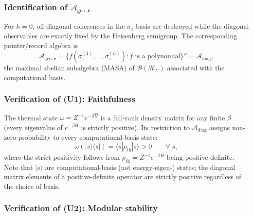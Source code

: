 \documentclass[12pt,a4paper,openany]{book}
\begin{document}
\subsubsection{Identification of $\mathcal{A}_{\mathrm{geo},\mathbf{c}}$}

For $h=0$, off-diagonal coherences in the $\sigma_z$ basis are destroyed while the diagonal observables are exactly fixed by the Heisenberg semigroup.  The corresponding pointer/record algebra is
\begin{equation}
\mathcal{A}_{\mathrm{geo},\mathbf{c}} = \{f(\sigma_z^{(1)}, \ldots, \sigma_z^{(n)}) : f \text{ is a polynomial}\}'' = \mathcal{A}_{\mathrm{diag}},
\end{equation}
the maximal abelian subalgebra (MASA) of $\mathcal{B}(\mathcal{H}_U)$ associated with the computational basis.

\subsubsection{Verification of (U1): Faithfulness}

The thermal state $\omega = Z^{-1}e^{-\beta\hat{H}}$ is a full-rank density matrix for any finite $\beta$ (every eigenvalue of $e^{-\beta\hat{H}}$ is strictly positive).
Its restriction to $\mathcal{A}_{\mathrm{diag}}$ assigns non-zero probability to every computational-basis state:
\begin{equation}
\omega(|s\rangle\langle s|) = \langle s | \rho_{\mathrm{th}} | s \rangle > 0 \qquad \forall\; s,
\end{equation}
where the strict positivity follows from $\rho_{\mathrm{th}} = Z^{-1}e^{-\beta\hat{H}}$ being positive definite.
Note that $|s\rangle$ are computational-basis (not energy-eigen-) states; the diagonal matrix elements of a positive-definite operator are strictly positive regardless of the choice of basis.

\subsubsection{Verification of (U2): Modular stability}
\end{document}
